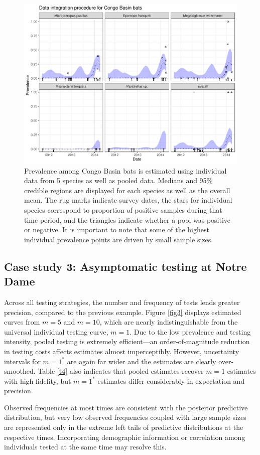 \documentclass{article}
\begin{document}
\begin{figure}[h!]
\centerline{\includegraphics[width=.8\textwidth]{Figure6.pdf}}
\caption{Prevalence among Congo Basin bats is estimated using individual data from 5 species as well as pooled data. Medians and 95\% credible regions are displayed for each species as well as the overall mean. The rug marks indicate survey dates, the stars for individual species correspond to proportion of positive samples during that time period, and the triangles indicate whether a pool was positive or negative. It is important to note that some of the highest individual prevalence points are driven by small sample sizes.  \label{fig6}}
\end{figure}

\subsection{Case study 3: Asymptomatic testing at Notre Dame}

Across all testing strategies, the number and frequency of tests lends greater precision, compared to the previous example. Figure \ref{fig3} displays estimated curves from $m=5$ and $m=10$, which are nearly indistinguishable from the universal individual testing curve, $m=1$. Due to the low prevalence and testing intensity, pooled testing is extremely efficient—an order-of-magnitude reduction in testing costs affects estimates almost imperceptibly. However, uncertainty intervals for $m=1^*$ are again far wider and the estimates are clearly over-smoothed. Table \ref{t4} also indicates that pooled estimates recover $m=1$ estimates with high fidelity, but $m=1^*$ estimates differ considerably in expectation and precision. 

Observed frequencies at most times are consistent with the posterior predictive distribution, but very low observed frequencies coupled with large sample sizes are represented only in the extreme left tails of predictive distributions at the respective times. Incorporating demographic information or correlation among individuals tested at the same time may resolve this.
\end{document}
